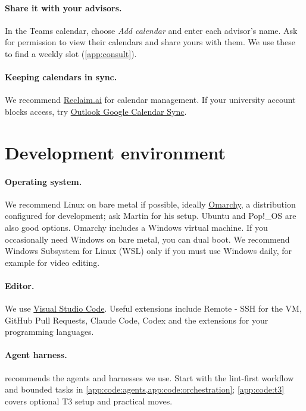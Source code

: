\paragraph{Share it with your advisors.} In the Teams calendar, choose \emph{Add calendar} and enter each advisor's name. Ask for permission to view their calendars and share yours with them. We use these to find a weekly slot (\cref{app:consult}).

\paragraph{Keeping calendars in sync.} We recommend \href{https://reclaim.ai/}{Reclaim.ai} for calendar management. If your university account blocks access, try \href{https://www.outlookgooglecalendarsync.com/}{Outlook Google Calendar Sync}.

\section{Development environment}\label{app:start:env}
\paragraph{Operating system.} We recommend Linux on bare metal if possible, ideally \href{https://omarchy.org/}{Omarchy}, a distribution configured for development; ask Martin for his setup. Ubuntu and Pop!\_OS are also good options. Omarchy includes a Windows virtual machine. If you occasionally need Windows on bare metal, you can dual boot. We recommend Windows Subsystem for Linux (WSL) only if you must use Windows daily, for example for video editing.

\paragraph{Editor.} We use \href{https://code.visualstudio.com/}{Visual Studio Code}. Useful extensions include Remote - SSH for the VM, GitHub Pull Requests, Claude Code, Codex and the extensions for your programming languages.

\paragraph{Agent harness.}  recommends the agents and harnesses we use. Start with the lint-first workflow and bounded tasks in \cref{app:code:agents,app:code:orchestration}; \cref{app:code:t3} covers optional T3 setup and practical moves.

